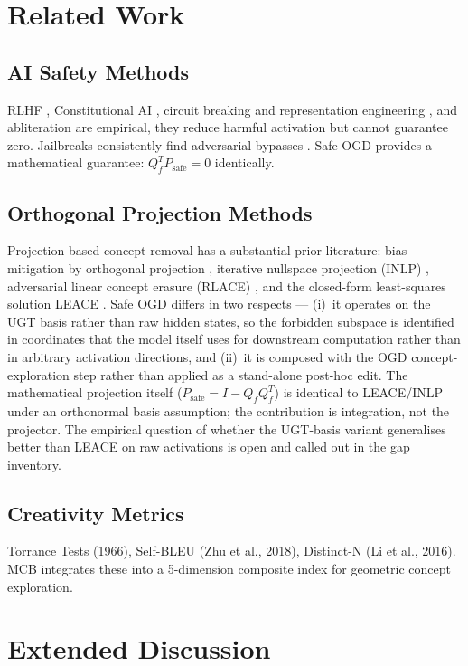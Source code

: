 \documentclass[11pt]{article}
\providecommand{\citep}[1]{\parencite{#1}}
\begin{document}
\section{Related Work}

\subsection{AI Safety Methods}
RLHF \citep{ouyang2022rlhf}, Constitutional AI \citep{bai2022constitutional}, circuit breaking and representation engineering \citep{zou2023repe}, and abliteration \citep{arditi2024abliteration} are empirical, they reduce harmful activation but cannot guarantee zero. Jailbreaks consistently find adversarial bypasses \citep{wei2023jailbroken}. Safe OGD provides a mathematical guarantee: $Q_f^T P_{\mathrm{safe}} = 0$ identically.

\subsection{Orthogonal Projection Methods}
Projection-based concept removal has a substantial prior literature: bias mitigation by orthogonal projection \citep{bolukbasi2016man}, iterative nullspace projection (INLP) \citep{ravfogel2020inlp}, adversarial linear concept erasure (RLACE) \citep{ravfogel2022rlace}, and the closed-form least-squares solution LEACE \citep{belrose2023leace}. Safe OGD differs in two respects --- (i)~it operates on the UGT basis rather than raw hidden states, so the forbidden subspace is identified in coordinates that the model itself uses for downstream computation rather than in arbitrary activation directions, and (ii)~it is composed with the OGD concept-exploration step rather than applied as a stand-alone post-hoc edit. The mathematical projection itself ($P_{\mathrm{safe}} = I - Q_f Q_f^T$) is identical to LEACE/INLP under an orthonormal basis assumption; the contribution is integration, not the projector. The empirical question of whether the UGT-basis variant generalises better than LEACE on raw activations is open and called out in the gap inventory.

\subsection{Creativity Metrics}
Torrance Tests (1966), Self-BLEU (Zhu et al., 2018), Distinct-N (Li et al., 2016). MCB integrates these into a 5-dimension composite index for geometric concept exploration.


\section{Extended Discussion}
\end{document}
